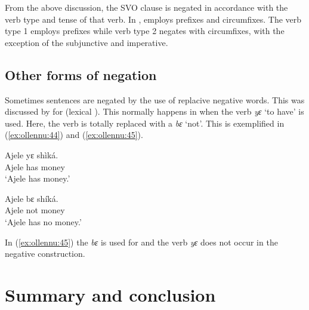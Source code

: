 \documentclass[output=paper,newtxmath,modfonts,nonflat,draftmode]{langsci/langscibook}
\begin{document}
From the above discussion, the SVO clause is negated in accordance with the verb type and tense of that verb. In ,  employs prefixes and circumfixes. The verb type 1 employs prefixes while verb type 2 negates with circumfixes, with the exception of the subjunctive and imperative.

\subsection{\label{sec:ollennu:2.4} Other forms of negation}

Sometimes sentences are negated by the use of replacive negative words. This was discussed by \citet[23]{caesar2012} for  (lexical ). This normally happens in  when the verb \textit{yɛ} `to have' is used. Here, the verb is totally replaced with a  \textit{bɛ} `not'. This is exemplified in (\ref{ex:ollennu:44}) and (\ref{ex:ollennu:45}).


\ea \label{ex:ollennu:44}
\gll Ajele yɛ shìká.\\
Ajele has money\\
\glt `Ajele has money.'
\z


\ea \label{ex:ollennu:45}
\gll Ajele bɛ shíká.\\
Ajele not money\\
\glt`Ajele has no money.'
\z


In (\ref{ex:ollennu:45}) the  \textit{bɛ} is used for  and the verb \textit{yɛ} does not occur in the negative construction.

\section{\label{sec:ollennu:3} Summary and conclusion}
\end{document}
